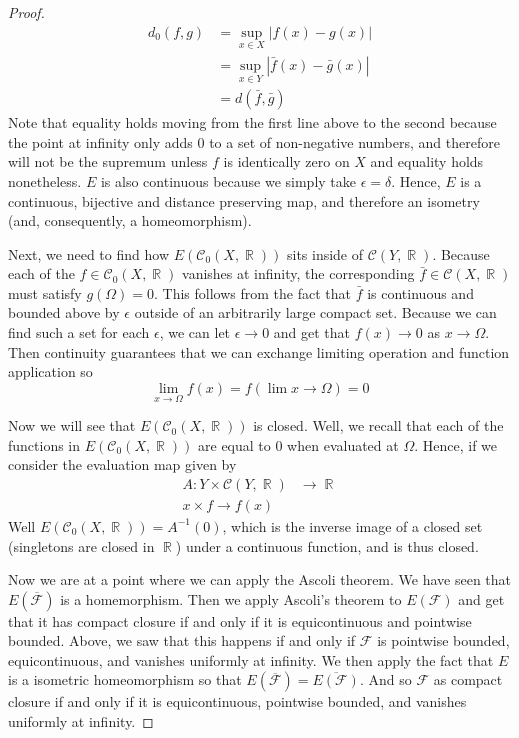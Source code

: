 \documentclass{article}
\DeclareMathOperator{\R}{\mathbb{R}}
\begin{document}
\begin{proof}
\begin{align*}
    d_0(f,g) &= \sup_{x\in X} |f(x) - g(x)| \\
    &= \sup_{x \in Y}|\bar{f}(x) - \bar{g}(x)| \\
    &= d(\bar{f},\bar{g})
  \end{align*}
  Note that equality holds moving from the first line above to the
  second because the point at infinity only adds $0$ to a set of
  non-negative numbers, and therefore will not be the supremum unless
  $f$ is identically zero on $X$ and equality holds nonetheless. $E$
  is also continuous because we simply take $\epsilon =
  \delta$. Hence, $E$ is a continuous, bijective and distance
  preserving map, and therefore an isometry (and, consequently, a
  homeomorphism).

  Next, we need to find how $E(\mathcal{C}_0(X,\R))$ sits inside of
  $\mathcal{C}(Y,\R)$. Because each of the $f \in \mathcal{C}_0(X,\R)$
  vanishes at infinity, the corresponding $\bar{f} \in
  \mathcal{C}(X,\R)$ must satisfy $g(\Omega) = 0$. This follows from
  the fact that $\bar{f}$ is continuous and bounded above by
  $\epsilon$ outside of an arbitrarily large compact set. Because we
  can find such a set for each $\epsilon$, we can let $\epsilon \to 0$
  and get that $f(x) \to 0$ as $x \to \Omega$. Then continuity
  guarantees that we can exchange limiting operation and function
  application so
  \[
  \lim_{x \to \Omega} f(x) = f(\lim x \to \Omega) = 0
  \]

  Now we will see that $E(\mathcal{C}_0(X,\R))$ is closed. Well, we
  recall that each of the functions in $E(\mathcal{C}_0(X,\R))$ are
  equal to 0 when evaluated at $\Omega$. Hence, if we consider the
  evaluation map given by
  \begin{align*}
    A: Y \times \mathcal{C}(Y, \R) &\to \R \\
    x \times f \to f(x)
  \end{align*}
  Well $E(\mathcal{C}_0(X,\R)) = A^{-1}(0)$, which is the inverse
  image of a closed set (singletons are closed in $\R$) under a
  continuous function, and is thus closed.

  Now we are at a point where we can apply the Ascoli theorem. We have
  seen that $E(\overline{\mathcal{F}})$ is a homemorphism. Then we
  apply Ascoli's theorem to $E(\mathcal{F})$ and get that it has
  compact closure if and only if it is equicontinuous and pointwise
  bounded. Above, we saw that this happens if and only if
  $\mathcal{F}$ is pointwise bounded, equicontinuous, and vanishes
  uniformly at infinity. We then apply the fact that $E$ is a
  isometric homeomorphism so that $E(\overline{\mathcal{F}}) =
  \overline{E(\mathcal{F})}$. And so $\mathcal{F}$ as compact closure
  if and only if it is equicontinuous, pointwise bounded, and vanishes
  uniformly at infinity.
\end{proof}
\end{document}
